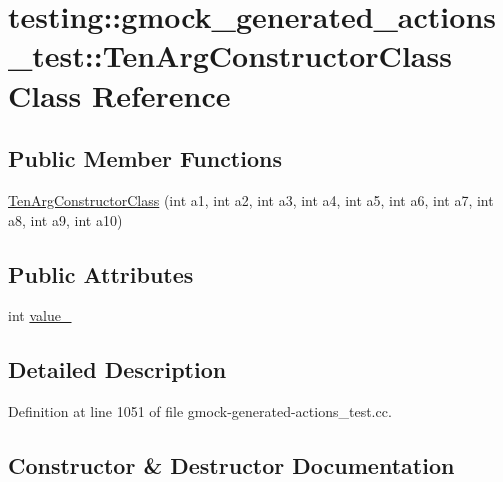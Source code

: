 \hypertarget{classtesting_1_1gmock__generated__actions__test_1_1_ten_arg_constructor_class}{}\section{testing\+:\+:gmock\+\_\+generated\+\_\+actions\+\_\+test\+:\+:Ten\+Arg\+Constructor\+Class Class Reference}
\label{classtesting_1_1gmock__generated__actions__test_1_1_ten_arg_constructor_class}
\subsection*{Public Member Functions}
\begin{DoxyCompactItemize}
\item 
\hyperlink{classtesting_1_1gmock__generated__actions__test_1_1_ten_arg_constructor_class_ac17a2190151616f986a193dfe0a03cb5}{Ten\+Arg\+Constructor\+Class} (int a1, int a2, int a3, int a4, int a5, int a6, int a7, int a8, int a9, int a10)
\end{DoxyCompactItemize}
\subsection*{Public Attributes}
\begin{DoxyCompactItemize}
\item 
int \hyperlink{classtesting_1_1gmock__generated__actions__test_1_1_ten_arg_constructor_class_ae3c388fd7e3cfbb95196712076a368ad}{value\+\_\+}
\end{DoxyCompactItemize}


\subsection{Detailed Description}


Definition at line 1051 of file gmock-\/generated-\/actions\+\_\+test.\+cc.



\subsection{Constructor \& Destructor Documentation}
